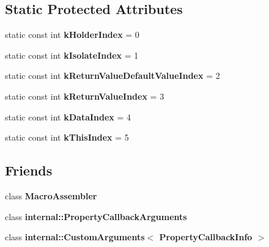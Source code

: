 \subsection*{Static Protected Attributes}
\begin{DoxyCompactItemize}
\item 
\hypertarget{classv8_1_1PropertyCallbackInfo_a8598985473483dfadba4e4c67251675b}{static const int {\bfseries k\-Holder\-Index} = 0}\label{classv8_1_1PropertyCallbackInfo_a8598985473483dfadba4e4c67251675b}

\item 
\hypertarget{classv8_1_1PropertyCallbackInfo_a59ba899cb580bc5e8adca6f799db3e2a}{static const int {\bfseries k\-Isolate\-Index} = 1}\label{classv8_1_1PropertyCallbackInfo_a59ba899cb580bc5e8adca6f799db3e2a}

\item 
\hypertarget{classv8_1_1PropertyCallbackInfo_a00849f770023891d1466176f5e0c8539}{static const int {\bfseries k\-Return\-Value\-Default\-Value\-Index} = 2}\label{classv8_1_1PropertyCallbackInfo_a00849f770023891d1466176f5e0c8539}

\item 
\hypertarget{classv8_1_1PropertyCallbackInfo_ae16cdf2c6ce787b21d94953cd514ed0e}{static const int {\bfseries k\-Return\-Value\-Index} = 3}\label{classv8_1_1PropertyCallbackInfo_ae16cdf2c6ce787b21d94953cd514ed0e}

\item 
\hypertarget{classv8_1_1PropertyCallbackInfo_a39fc5d6aaccb2916af503c7120ab99c5}{static const int {\bfseries k\-Data\-Index} = 4}\label{classv8_1_1PropertyCallbackInfo_a39fc5d6aaccb2916af503c7120ab99c5}

\item 
\hypertarget{classv8_1_1PropertyCallbackInfo_a715d28b9c57a581de1698673c9b9eb8a}{static const int {\bfseries k\-This\-Index} = 5}\label{classv8_1_1PropertyCallbackInfo_a715d28b9c57a581de1698673c9b9eb8a}

\end{DoxyCompactItemize}
\subsection*{Friends}
\begin{DoxyCompactItemize}
\item 
\hypertarget{classv8_1_1PropertyCallbackInfo_ae605ff1d9d93250ace8a0a8b8d1dee67}{class {\bfseries Macro\-Assembler}}\label{classv8_1_1PropertyCallbackInfo_ae605ff1d9d93250ace8a0a8b8d1dee67}

\item 
\hypertarget{classv8_1_1PropertyCallbackInfo_a1ba96a1268a72c23f50314cd99c76f1b}{class {\bfseries internal\-::\-Property\-Callback\-Arguments}}\label{classv8_1_1PropertyCallbackInfo_a1ba96a1268a72c23f50314cd99c76f1b}

\item 
\hypertarget{classv8_1_1PropertyCallbackInfo_ad1d1e15ddaed2ab44e8f21c5564881ba}{class {\bfseries internal\-::\-Custom\-Arguments$<$ Property\-Callback\-Info $>$}}\label{classv8_1_1PropertyCallbackInfo_ad1d1e15ddaed2ab44e8f21c5564881ba}

\end{DoxyCompactItemize}



